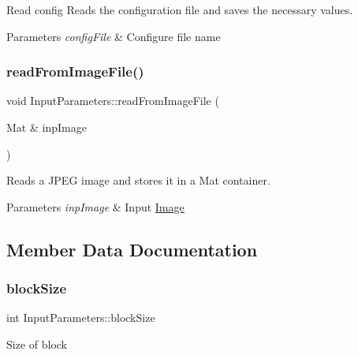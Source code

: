 Read config Reads the configuration file and saves the necessary values. 


\begin{DoxyParams}{Parameters}
{\em config\+File} & Configure file name \\
\hline
\end{DoxyParams}
\mbox{\label{classInputParameters_a3fbb650aef6f1e08d2bfea252d0386ee}} 
\subsubsection{\texorpdfstring{read\+From\+Image\+File()}{readFromImageFile()}}
{\footnotesize\ttfamily void Input\+Parameters\+::read\+From\+Image\+File (\begin{DoxyParamCaption}\item[{Mat \&}]{inp\+Image }\end{DoxyParamCaption})}

Reads a J\+P\+EG image and stores it in a Mat container.


\begin{DoxyParams}{Parameters}
{\em inp\+Image} & Input \mbox{\hyperlink{classImage}{Image}} \\
\hline
\end{DoxyParams}


\subsection{Member Data Documentation}
\mbox{\label{classInputParameters_a0a4b4c27431edde22c7c53746543f3c3}} 
\subsubsection{\texorpdfstring{block\+Size}{blockSize}}
{\footnotesize\ttfamily int Input\+Parameters\+::block\+Size}

Size of block \mbox{\label{classInputParameters_a4386973ae0bf43b9040f2bbd0acfcdc0}} 
